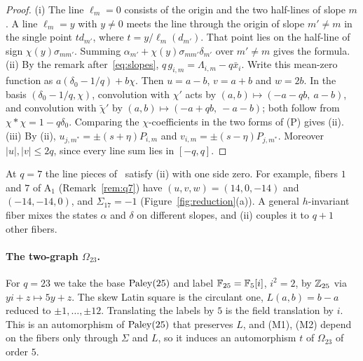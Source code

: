 \begin{proof}
(i) The line $\ell_m=0$ consists of the origin and the two half-lines of slope $m$.
A line $\ell_m=y$ with $y\ne0$ meets the line through the origin of slope $m'\ne m$ in the single point $td_{m'}$, where $t=y/\ell_m(d_{m'})$.
That point lies on the half-line of sign $\chi(y)\sigma_{mm'}$.
Summing $\alpha_{m'}+\chi(y)\sigma_{mm'}\delta_{m'}$ over $m'\ne m$ gives the formula.
(ii) By the remark after~\eqref{eq:slopes}, $q\,g_{i,m}=\Lambda_{i,m}-q\bar x_i$.
Write this mean-zero function as $a(\delta_0-1/q)+b\chi$.
Then $u=a-b$, $v=a+b$ and $w=2b$.
In the basis $(\delta_0-1/q,\chi)$, convolution with $\chi'$ acts by $(a,b)\mapsto(-a-qb,\ a-b)$, and convolution with $\tilde\chi'$ by $(a,b)\mapsto(-a+qb,\ -a-b)$; both follow from $\chi*\chi=1-q\delta_0$.
Comparing the $\chi$-coefficients in the two forms of (P) gives (ii).
(iii) By (ii), $u_{j,m^*}=\pm(s+\eta)P_{i,m}$ and $v_{i,m}=\pm(s-\eta)P_{j,m^*}$.
Moreover $|u|,|v|\le2q$, since every line sum lies in $[-q,q]$.
\end{proof}

At $q=7$ the line pieces of~\cite{Plummer442} satisfy (ii) with one side zero.
For example, fibers $1$ and $7$ of $\mathrm A_1$ (Remark~\ref{rem:q7}) have $(u,v,w)=(14,0,-14)$ and $(-14,-14,0)$, and $\Sigma_{17}=-1$ (Figure~\ref{fig:reduction}(a)).
A general $h$-invariant fiber mixes the states $\alpha$ and $\delta$ on different slopes, and (ii) couples it to $q+1$ other fibers.

\paragraph{The two-graph $\Omega_{23}$.} For $q=23$ we take the base $\mathrm{Paley}(25)$ and label $\mathbb{F}_{25}=\mathbb{F}_5[i]$, $i^2=2$,
by $\mathbb{Z}_{25}$ via $yi+z\mapsto5y+z$. The skew Latin square is the circulant one, $L(a,b)=b-a$ reduced to
$\pm1,\dots,\pm12$. Translating the labels by $5$ is the field translation by $i$. This is an automorphism of
$\mathrm{Paley}(25)$ that preserves $L$, and (M1), (M2) depend on the fibers only through $\Sigma$ and $L$, so it induces an
automorphism $t$ of $\Omega_{23}$ of order $5$.

